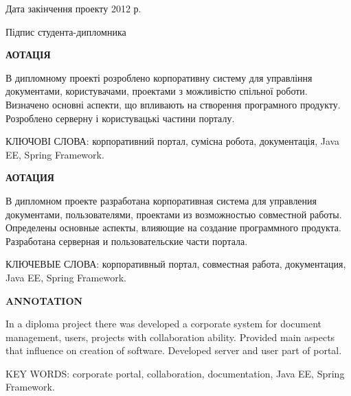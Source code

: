 \par Дата закінчення проекту   \noindent\underline{} 2012 р.
\vspace{10 mm}
\par Підпис студента-дипломника \noindent\underline{\makebox[1.0in][c]{}}

\newpage
\begin{center}
\bf{АОТАЦІЯ}
\end{center}

\par В дипломному проекті розроблено корпоративну систему для управління документами, користувачами, проектами з можливістю спільної роботи. Визначено основні аспекти, що впливають на створення програмного продукту. Розроблено серверну і користувацькі частини порталу.
\vspace{10 mm}
\par КЛЮЧОВІ СЛОВА: корпоративний портал, сумісна робота, документація, Java EE, Spring Framework.

\newpage
\begin{center}
\bf{АОТАЦИЯ}
\end{center}

\par В дипломном проекте разработана корпоративная система для управления документами, пользователями, проектами из возможностью совместной работы. Определены основные аспекты, влияющие на создание программного продукта. Разработана серверная и пользовательские части портала.
\vspace{10 mm}
\par КЛЮЧЕВЫЕ СЛОВА: корпоративный портал, совместная работа, документация, Java EE, Spring Framework.


\newpage
\begin{center}
\bf{ANNOTATION}
\end{center}

\par In a diploma project there was developed a corporate system for document management, users, projects with collaboration ability. Provided main aspects that influence on creation of software. Developed server and user part of portal.
\vspace{10 mm}
\par KEY WORDS: corporate portal, collaboration, documentation, Java EE, Spring Framework.



